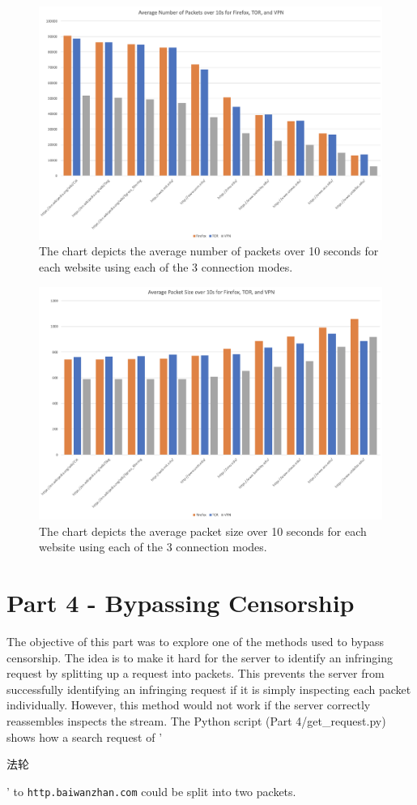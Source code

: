 \documentclass[11pt]{article}
\begin{document}
\begin{figure}[htbp]
  \centering
  \includegraphics[width=.9\linewidth]{./avg-number-packets.png}
  \caption{\label{fig:avg-number-packets}
  The chart depicts the average number of packets over 10 seconds for each website using each of the 3 connection modes.}
\end{figure}
\begin{figure}[htbp]
  \centering
  \includegraphics[width=.9\linewidth]{./avg-packet-size.png}
  \caption{\label{fig:avg-packet-size}
  The chart depicts the average packet size over 10 seconds for each website using each of the 3 connection modes.}
\end{figure}

\newpage
\section*{Part 4 - Bypassing Censorship}
\label{sec:part-4}
The objective of this part was to explore one of the methods used to bypass censorship.
The idea is to make it hard for the server to identify an infringing request by
splitting up a request into packets. This prevents the server from successfully identifying an
infringing request if it is simply inspecting each packet individually.
However, this method would not work if the server correctly reassembles inspects the stream.
The Python script (Part 4/get\_request.py) shows how a search request of '\begin{CJK*}{UTF8}{gbsn}法轮\end{CJK*}' to \verb|http.baiwanzhan.com| could be split into two packets.
\end{document}
